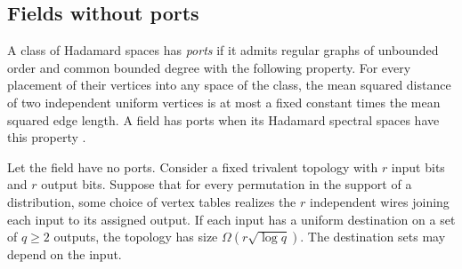 \subsection{Fields without ports}

A class of Hadamard spaces has \emph{ports} if it admits regular
graphs of unbounded order and common bounded degree with the following
property. For every placement of their vertices into any space of the
class, the mean squared distance of two independent uniform vertices
is at most a fixed constant times the mean squared edge length.
A field has ports when its Hadamard spectral spaces have this property
\cite[Definition~]{oaG}.

\begin{lemma}\label{lem:uniform-demand}
Let the field have no ports. Consider a fixed trivalent topology with
\(r\) input bits and \(r\) output bits. Suppose that for every permutation
in the support of a distribution, some choice of vertex tables realizes
the \(r\) independent wires joining each input to its assigned output.
If each input has a uniform destination on a set of \(q\ge2\) outputs,
the topology has size \(\Omega(r\sqrt{\log q})\). The destination sets
may depend on the input.
\end{lemma}

